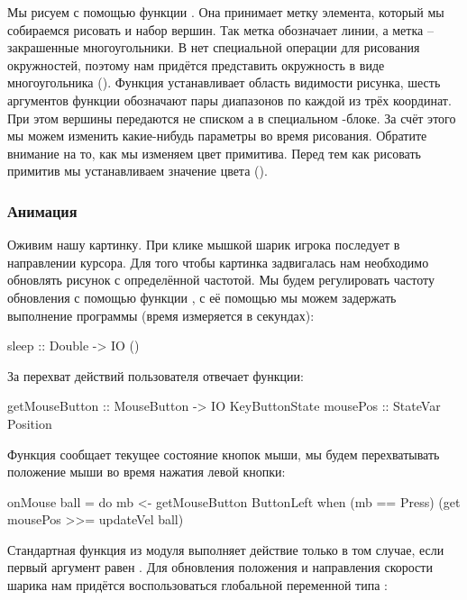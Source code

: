 
Мы рисуем с помощью функции . Она принимает метку
элемента, который мы собираемся рисовать и набор вершин. Так метка
 обозначает линии, а метка  -- закрашенные
многоугольники. В  нет специальной операции для рисования
окружностей, поэтому нам придётся представить окружность в виде
многоугольника (). Функция  устанавливает область
видимости рисунка, шесть аргументов функции обозначают пары диапазонов
по каждой из трёх координат. При этом вершины передаются не списком а в
специальном -блоке. За счёт этого мы можем изменить какие-нибудь
параметры  во время рисования. Обратите внимание на то, как
мы изменяем цвет примитива. Перед тем как рисовать примитив мы
устанавливаем значение цвета ().

\subsubsection{Анимация}

Оживим нашу картинку. При клике мышкой шарик игрока последует в
направлении курсора. Для того чтобы картинка задвигалась нам необходимо
обновлять рисунок с определённой частотой. Мы будем регулировать частоту
обновления с помощью функции , с её помощью мы можем задержать
выполнение программы (время измеряется в секундах):


\begin{code}
sleep :: Double -> IO ()
\end{code}

За перехват действий пользователя отвечает функции:


\begin{code}
getMouseButton  :: MouseButton -> IO KeyButtonState
mousePos        :: StateVar Position
\end{code}

Функция  сообщает текущее состояние кнопок мыши, мы
будем перехватывать положение мыши во время нажатия левой кнопки:


\begin{code}
onMouse ball = do
    mb <- getMouseButton ButtonLeft
    when (mb == Press) (get mousePos >>= updateVel ball)
\end{code}

Стандартная функция  из модуля  выполняет
действие только в том случае, если первый аргумент равен . Для
обновления положения и направления скорости шарика нам придётся
воспользоваться глобальной переменной типа :



